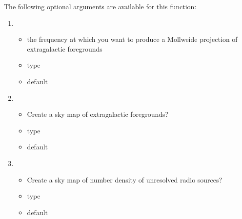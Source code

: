 \documentclass[letterpaper,10pt,english]{sphinxmanual}
\begin{document}
\begin{sphinxVerbatim}[commandchars=\\\{\}]
  
\end{sphinxVerbatim}

\sphinxAtStartPar
The following optional arguments are available for this function:\sphinxhyphen{}
\begin{enumerate}
%
\item {} 
\sphinxAtStartPar
{}
\begin{itemize}
\item {} 
\sphinxAtStartPar
the frequency at which you want to produce a Mollweide projection
of extragalactic foregrounds

\item {} 
\sphinxAtStartPar
type 

\item {} 
\sphinxAtStartPar
default 

\end{itemize}

\item {} 
\sphinxAtStartPar
{}
\begin{itemize}
\item {} 
\sphinxAtStartPar
Create a sky map of extragalactic foregrounds?

\item {} 
\sphinxAtStartPar
type 

\item {} 
\sphinxAtStartPar
default 

\end{itemize}

\item {} 
\sphinxAtStartPar
{}
\begin{itemize}
\item {} 
\sphinxAtStartPar
Create a sky map of number density of unresolved radio sources?

\item {} 
\sphinxAtStartPar
type 

\item {} 
\sphinxAtStartPar
default 


\end{itemize}
\end{enumerate}
\end{document}
